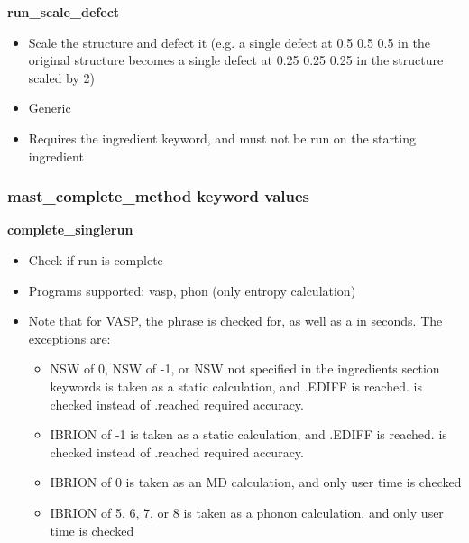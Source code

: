 \documentclass[letterpaper,10pt,english]{sphinxmanual}
\begin{document}
\textbf{run\_scale\_defect}
\begin{itemize}
\item {} 
Scale the structure and defect it (e.g. a single defect at 0.5 0.5 0.5 in the original structure becomes a single defect at 0.25 0.25 0.25 in the structure scaled by 2)

\item {} 
Generic

\item {} 
Requires the  ingredient keyword, and must not be run on the starting ingredient

\end{itemize}


\subsubsection{mast\_complete\_method keyword values}
\label{3_0_inputfile:mast-complete-method-keyword-values}
\textbf{complete\_singlerun}
\begin{itemize}
\item {} 
Check if run is complete

\item {} 
Programs supported: vasp, phon (only entropy calculation)

\item {} 
Note that for VASP, the phrase  is checked for, as well as a  in seconds. The exceptions are:
\begin{itemize}
\item {} 
NSW of 0, NSW of -1, or NSW not specified in the ingredients section keywords is taken as a static calculation, and .EDIFF is reached. is checked instead of .reached required accuracy.

\item {} 
IBRION of -1 is taken as a static calculation, and .EDIFF is  reached. is checked instead of .reached required accuracy.

\item {} 
IBRION of 0 is taken as an MD calculation, and only user time is checked

\item {} 
IBRION of 5, 6, 7, or 8 is taken as a phonon calculation, and only user time is checked

\end{itemize}

\end{itemize}
\end{document}
